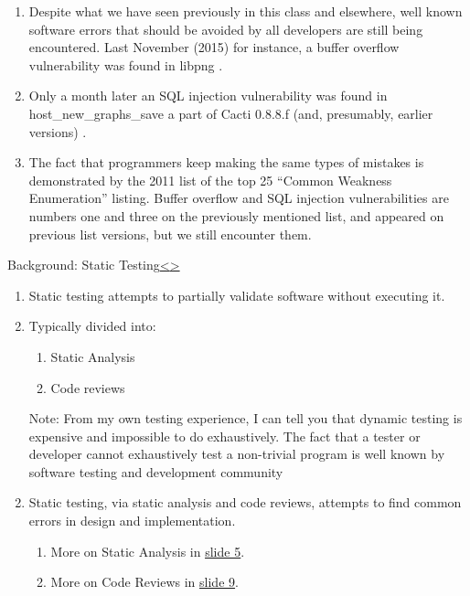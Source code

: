 \documentclass[12pt]{extarticle}
\newenvironment{instructionblock}{\Large\bgroup}{\egroup}
\newcommand{\ben}{\begin{enumerate}}
\newcommand{\een}{\end{enumerate}}
\begin{document}
\begin{enumerate}
	\item Despite what we have seen previously in this class and elsewhere, well known software errors that should be avoided by all developers are still being encountered.  Last November (2015) for instance, a buffer overflow vulnerability was found in libpng \cite{CVE-2015-8126}.
	\item Only a month later an SQL injection vulnerability was found in host\_new\_graphs\_save a part of Cacti 0.8.8.f (and, presumably, earlier versions) \cite{CVE-2015-8377}.
	\item The fact that programmers keep making the same types of mistakes is demonstrated by the 2011 list of the top 25 ``Common Weakness Enumeration'' listing\cite{CommonWeaknessEnumeration}. Buffer overflow and SQL injection vulnerabilities are numbers one and three on the previously mentioned list, and appeared on previous list versions, but we still encounter them.
\end{enumerate}





\pagebreak
\begin{slide}{Background: Static Testing}{\hyperref[slide 6]{\textless}\hyperref[slide 8]{\textgreater}}
	\vskip 10pt
	\begin{instructionblock}
		\begin{enumerate}
			\item Static testing attempts to partially validate software without executing it.\cite{StaticTesting} 
			\item Typically divided into:
			\ben
			\item Static Analysis
			\item Code reviews
			\een
		\end{enumerate}
	\end{instructionblock}
\end{slide}
\begin{enumerate}
\item[Note:] From my own testing experience, I can tell you that dynamic testing is expensive and impossible to do exhaustively. The fact that a tester or developer cannot exhaustively test a non-trivial program is well known by software testing and development community\cite{WikipediaHaltingProblem}
\item Static testing, via static analysis and code reviews, attempts to find common errors in design and implementation\cite{StaticTesting}.
\ben
	\item More on Static Analysis in \underline{\hyperref[slide 5]{slide 5}}.
	\item More on Code Reviews in \underline{\hyperref[slide 9]{slide 9}}. 	
\een
\end{enumerate}
\end{document}
